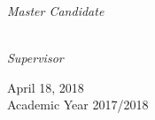 \thispagestyle{empty}
\begin{center}
\large


\vspace*{3cm}
\begingroup
	\large
	\spacedallcaps{\myUni}\\\medskip    
    \normalsize
    \color{black}\spacedallcaps{\myDepartment} \\
    \color{black}{\mySubtitle}
\endgroup

\vfill

\begingroup
\large \color{Maroon}\spacedallcaps{\myTitle} \\ \bigskip %
\endgroup
\vfill


\textit{Master Candidate} \\ \smallskip
\spacedlowsmallcaps{\myName} \\ \bigskip \bigskip

\textit{Supervisor} \\ \smallskip
\spacedlowsmallcaps{\myProf}



\centering

\vfill



{
	\normalsize
    April 18, 2018\\
	Academic Year 2017/2018 %
}




    
\end{center}
